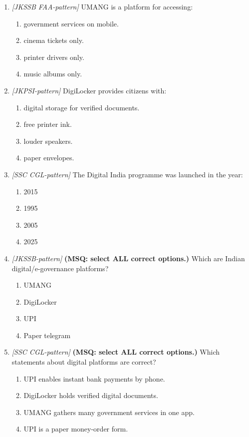 \documentclass[11pt]{article}
\begin{document}
\begin{enumerate}[label=\textbf{Q\arabic*.}, leftmargin=*]
\item \textit{[JKSSB FAA-pattern]} UMANG is a platform for accessing:
  \begin{enumerate}[label=\Alph*.]
    \item government services on mobile.
    \item cinema tickets only.
    \item printer drivers only.
    \item music albums only.
  \end{enumerate}
\item \textit{[JKPSI-pattern]} DigiLocker provides citizens with:
  \begin{enumerate}[label=\Alph*.]
    \item digital storage for verified documents.
    \item free printer ink.
    \item louder speakers.
    \item paper envelopes.
  \end{enumerate}
\item \textit{[SSC CGL-pattern]} The Digital India programme was launched in the year:
  \begin{enumerate}[label=\Alph*.]
    \item 2015
    \item 1995
    \item 2005
    \item 2025
  \end{enumerate}
\item \textit{[JKSSB-pattern]} \textbf{(MSQ: select ALL correct options.)} Which are Indian digital/e-governance platforms?
  \begin{enumerate}[label=\Alph*.]
    \item UMANG
    \item DigiLocker
    \item UPI
    \item Paper telegram
  \end{enumerate}
\item \textit{[SSC CGL-pattern]} \textbf{(MSQ: select ALL correct options.)} Which statements about digital platforms are correct?
  \begin{enumerate}[label=\Alph*.]
    \item UPI enables instant bank payments by phone.
    \item DigiLocker holds verified digital documents.
    \item UMANG gathers many government services in one app.
    \item UPI is a paper money-order form.
  \end{enumerate}
\end{enumerate}
\def\JKSSBLessonID{57}\def\JKSSBAnswers{0}
\end{document}
